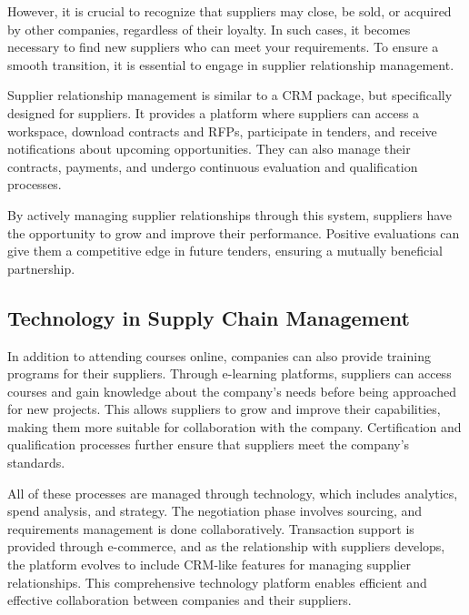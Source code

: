 However, it is crucial to recognize that suppliers may close, be sold,
or acquired by other companies, regardless of their loyalty. In such
cases, it becomes necessary to find new suppliers who can meet your
requirements. To ensure a smooth transition, it is essential to engage
in supplier relationship management.

Supplier relationship management is similar to a CRM package, but
specifically designed for suppliers. It provides a platform where
suppliers can access a workspace, download contracts and RFPs,
participate in tenders, and receive notifications about upcoming
opportunities. They can also manage their contracts, payments, and
undergo continuous evaluation and qualification processes.

By actively managing supplier relationships through this system,
suppliers have the opportunity to grow and improve their performance.
Positive evaluations can give them a competitive edge in future tenders,
ensuring a mutually beneficial partnership.

\subsection{Technology in Supply Chain
  Management}\label{technology-in-supply-chain-management}

In addition to attending courses online, companies can also provide
training programs for their suppliers. Through e-learning platforms,
suppliers can access courses and gain knowledge about the company's
needs before being approached for new projects. This allows suppliers to
grow and improve their capabilities, making them more suitable for
collaboration with the company. Certification and qualification
processes further ensure that suppliers meet the company's standards.

All of these processes are managed through technology, which includes
analytics, spend analysis, and strategy. The negotiation phase involves
sourcing, and requirements management is done collaboratively.
Transaction support is provided through e-commerce, and as the
relationship with suppliers develops, the platform evolves to include
CRM-like features for managing supplier relationships. This
comprehensive technology platform enables efficient and effective
collaboration between companies and their suppliers.
